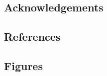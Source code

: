 \documentclass[
]{article}
\newlength{\cslhangindent}
\newlength{\cslentryspacingunit} %
\newenvironment{CSLReferences}[2] %
 {%
  \setlength{\parindent}{0pt}
  \ifodd #1
  \let\oldpar\par
  \def\par{\hangindent=\cslhangindent\oldpar}
  \fi
  \setlength{\parskip}{#2\cslentryspacingunit}
 }%
 {}
\begin{document}
\hypertarget{acknowledgements}{%
\subsection{Acknowledgements}\label{acknowledgements}}

\newpage

\hypertarget{references}{%
\subsection{References}\label{references}}

\setlength{\parindent}{-0.25in}
\setlength{\leftskip}{0.25in}

\noindent

\hypertarget{refs}{}
\begin{CSLReferences}{0}{0}
\end{CSLReferences}


\setlength{\parindent}{0in}
\setlength{\leftskip}{0in}

\newpage

\hypertarget{figures}{%
\subsection{Figures}\label{figures}}
\end{document}
